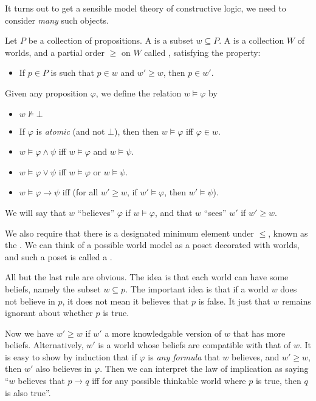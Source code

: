\documentclass[a4paper]{article}
\begin{document}
It turns out to get a sensible model theory of constructive logic, we need to consider \emph{many} such objects.

\begin{defi}
  Let $P$ be a collection of propositions. A  is a subset $w \subseteq P$. A  is a collection $W$ of worlds, and a partial order $\geq$ on $W$ called , satisfying the  property:
  \begin{itemize}
    \item If $p \in P$ is such that $p \in w$ and $w' \geq w$, then $p \in w'$.
  \end{itemize}
  Given any proposition $\varphi$, we define the relation $w \vDash \varphi$ by
  \begin{itemize}
    \item $w \not\vDash \bot$
    \item If $\varphi$ is \emph{atomic} (and not $\bot$), then then $w \vDash \varphi$ iff $\varphi \in w$.
    \item $w \vDash \varphi \wedge \psi$ iff $w \vDash \varphi$ and $w \vDash \psi$.
    \item $w \vDash \varphi \vee \psi$ iff $w \vDash \varphi$ or $w \vDash \psi$.
    \item $w \vDash \varphi \to \psi$ iff (for all $w' \geq w$, if $w' \vDash \varphi$, then $w' \vDash \psi$).
  \end{itemize}
  We will say that $w$ ``believes'' $\varphi$ if $w \vDash \varphi$, and that $w$ ``sees'' $w'$ if $w' \geq w$.

  We also require that there is a designated minimum element under $\leq$, known as the . We can think of a possible world model as a poset decorated with worlds, and such a poset is called a .
\end{defi}
All but the last rule are obvious. The idea is that each world can have some beliefs, namely the subset $w \subseteq p$. The important idea is that if a world $w$ does not believe in $p$, it does not mean it believes that $p$ is false. It just that $w$ remains ignorant about whether $p$ is true.

Now we have $w' \geq w$ if $w'$ a more knowledgable version of $w$ that has more beliefs. Alternatively, $w'$ is a world whose beliefs are compatible with that of $w$. It is easy to show by induction that if $\varphi$ is \emph{any formula} that $w$ believes, and $w' \geq w$, then $w'$ also believes in $\varphi$. Then we can interpret the law of implication as saying ``$w$ believes that $p \to q$ iff for any possible thinkable world where $p$ is true, then $q$ is also true''.
\end{document}
